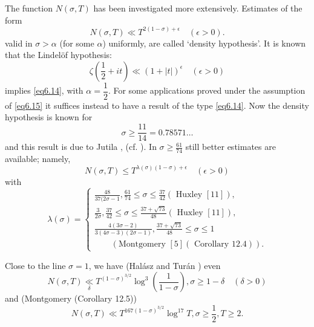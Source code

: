 The function $N(\sigma ,T)$ has been investigated more
extensively. Estimates of the form 
\begin{equation*}
N(\sigma,T )\ll T^{2(1-\sigma)+\epsilon}\quad (\epsilon >
0). \tag{6.14}\label{eq6.14} 
\end{equation*}
valid in $\sigma > \alpha$ (for some $\alpha$) uniformly, are called
`density hypothesis'. It is known that the Lindel\"of hypothesis: 
\begin{equation*}
\zeta (\frac{1}{2}+it) \ll (1+|t|)^{\epsilon} \quad (\epsilon >
0) \tag{6.15} \label{eq6.15}
\end{equation*}
implies \eqref{eq6.14}, with $\alpha = \dfrac{1}{2}$. For some applications
proved under the assumption of\pageoriginale 
\eqref{eq6.15} it suffices instead to have a
result of the type \eqref{eq6.14}. Now the density hypothesis is known for  
\begin{equation*}
\sigma \geq \frac{11}{14} = 0.78571 \ldots \tag{6.16}\label{eq6.16} 
\end{equation*}
and this result is due to Jutila \cite{key9}, \cite{key10}
(cf. \cite{key12}). In $\sigma \geq \frac{61}{74}$ still better
estimates are available; namely,  
\begin{equation*}
N(\sigma ,T) \leq T^{\lambda (\sigma)(1-\sigma )+\epsilon}\quad
(\epsilon > 0) \tag{6.17}\label{eq6.17} 
\end{equation*}
with
\begin{equation*}
\lambda(\sigma) =
\begin{cases}
\frac{48}{37(2\sigma -1},\frac{61}{74}\leq \sigma \leq \frac{37}{42}
(\text{ Huxley }[11]),\\ 
\frac{3}{2\sigma},\frac{37}{42}\leq \sigma \leq
\frac{37+\sqrt{73}}{48} (\text{ Huxley }[11]),\\ 
\frac{4(3\sigma -2)}{3(4\sigma - 3)(2\sigma
  -1)},\frac{37+\sqrt{73}}{48}\leq \sigma \leq 1\\
\qquad (\text{Montgomery }[5] (\text{ Corollary }12.4)). 
\end{cases}\tag{6.18}\label{eq6.18}
\end{equation*}

Close to the line $\sigma = 1$, we have (Hal\'asz and Tur\'an
\cite{key1}) even 
\begin{equation*}
N(\sigma ,T)\underset{\delta}{\ll} T^{(1-\sigma)^{3/2}} \log^3
(\frac{1}{1-\sigma}),\sigma \geq 1 - \delta \quad (\delta > 0)
\tag{6.19}\label{eq6.19} 
\end{equation*}
and (Montgomery \cite{key5} (Corollary 12.5))
\begin{equation*}
N(\sigma ,T)\ll T^{167(1-\sigma)^{3/2}} \log^{17}T,\sigma \geq
\frac{1}{2},T \geq 2. \tag{6.20}\label{eq6.20} 
\end{equation*}

